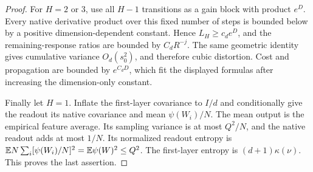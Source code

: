 \begin{proof}
For $H=2$ or $3$, use all $H-1$ transitions as a gain block with product $e^D$. Every native derivative product over this fixed number of steps is bounded below by a positive dimension-dependent constant. Hence $L_H\ge c_de^D$, and the remaining-response ratios are bounded by $C_dR^{-j}$. The same geometric identity gives cumulative variance $O_d(s_0^2)$, and therefore cubic distortion. Cost and propagation are bounded by $e^{C_dD}$, which fit the displayed formulas after increasing the dimension-only constant.

Finally let $H=1$. Inflate the first-layer covariance to $I/d$ and conditionally give the readout its native covariance and mean $\psi(W_i)/N$. The mean output is the empirical feature average. Its sampling variance is at most $Q^2/N$, and the native readout adds at most $1/N$. Its normalized readout entropy is $\mathbb E N\sum_i[\psi(W_i)/N]^2=\mathbb E\psi(W)^2\le Q^2$. The first-layer entropy is $(d+1)\kappa(\nu)$. This proves the last assertion.
\end{proof}
